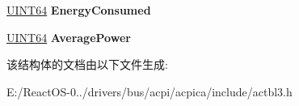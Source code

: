 \begin{DoxyCompactItemize}
\item 
\mbox{\label{structacpi__mpst__shared_a20f8bcb1fdc53891f40d9a43320d961d}} 
\hyperlink{_processor_bind_8h_a57be03562867144161c1bfee95ca8f7c}{U\+I\+N\+T64} {\bfseries Energy\+Consumed}
\item 
\mbox{\label{structacpi__mpst__shared_a1c3586ef37a9f2d1cc7be30271e5f589}} 
\hyperlink{_processor_bind_8h_a57be03562867144161c1bfee95ca8f7c}{U\+I\+N\+T64} {\bfseries Average\+Power}
\end{DoxyCompactItemize}


该结构体的文档由以下文件生成\+:\begin{DoxyCompactItemize}
\item 
E\+:/\+React\+O\+S-\/0../drivers/bus/acpi/acpica/include/actbl3.\+h\end{DoxyCompactItemize}
